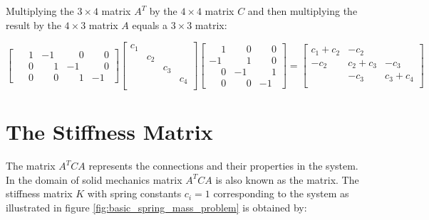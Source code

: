Multiplying the $3 \times 4$ matrix $A^T$ by the $4 \times 4$ matrix
$C$ and then multiplying the result by the $4 \times 3$ matrix $A$ equals
a $3 \times 3$ matrix:

\begin{equation*}
\begin{bmatrix}
  \phantom{-}1 &           -1 & \phantom{-}0 & \phantom{-}0 \\
  \phantom{-}0 & \phantom{-}1 &           -1 & \phantom{-}0 \\
  \phantom{-}0 & \phantom{-}0 & \phantom{-}1 &           -1 
\end{bmatrix}
\begin{bmatrix}
c_1 &  &  &  \\
 & c_2 &  &  \\
 &  & c_3 &  \\
 &  &  & c_4 \\
\end{bmatrix}
\begin{bmatrix}
 \phantom{-}1 & \phantom{-}0 & \phantom{-}0 \\
           -1 & \phantom{-}1 & \phantom{-}0 \\
 \phantom{-}0 &           -1 & \phantom{-}1 \\
 \phantom{-}0 & \phantom{-}0 &           -1
\end{bmatrix}
=
\begin{bmatrix}
 c_1 + c_2 & -c_2       &            \\
      -c_2 &  c_2 + c_3 &       -c_3 \\
           &       -c_3 &  c_3 + c_4 \\
\end{bmatrix}
\end{equation*}

\section{The Stiffness Matrix}
\label{sec:the-stiffness-matrix}
The matrix $A^T C A$ represents the connections and their properties
in the system. In the domain of solid
mechanics matrix $A^T C A$ is also known as the 
 matrix. The stiffness matrix $K$ with spring constants
$c_i = 1$ corresponding to the
system as illustrated in
figure \vref{fig:basic_spring_mass_problem} is obtained by:

